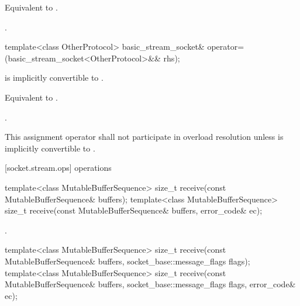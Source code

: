 \begin{itemdescr}
\pnum
\effects Equivalent to .

\pnum
\returns {}.
\end{itemdescr}

\begin{itemdecl}
template<class OtherProtocol>
  basic_stream_socket& operator=(basic_stream_socket<OtherProtocol>&& rhs);
\end{itemdecl}

\begin{itemdescr}
\pnum
\requires {} is implicitly convertible to .

\pnum
\effects Equivalent to .

\pnum
\returns {}.

\pnum
\remarks This assignment operator shall not participate in overload resolution unless  is implicitly convertible to .
\end{itemdescr}



[socket.stream.ops]{ operations}

\begin{itemdecl}
template<class MutableBufferSequence>
  size_t receive(const MutableBufferSequence& buffers);
template<class MutableBufferSequence>
  size_t receive(const MutableBufferSequence& buffers,
                 error_code& ec);
\end{itemdecl}

\begin{itemdescr}
\pnum
\returns {}.
\end{itemdescr}

\begin{itemdecl}
template<class MutableBufferSequence>
  size_t receive(const MutableBufferSequence& buffers,
                 socket_base::message_flags flags);
template<class MutableBufferSequence>
  size_t receive(const MutableBufferSequence& buffers,
                 socket_base::message_flags flags, error_code& ec);
\end{itemdecl}

